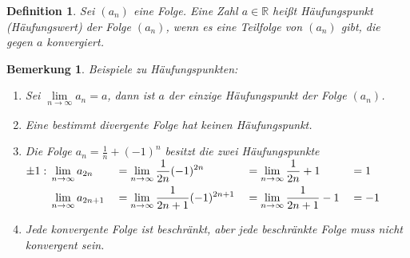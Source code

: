 \documentclass[a4paper,titlepage,oneside]{article}
\def\R{\ensuremath{\mathbb{R}} }
\renewcommand{\liminf}[2][n]{\ensuremath{\lim\limits_{#1 \rightarrow \infty}{#2}}}
\theoremstyle{thmstyle}
\newtheorem{defi}[satz]{Definition}
\newtheorem{bem}[satz]{Bemerkung}
\theoremstyle{subthmstyle}
\begin{document}
\begin{defi}
Sei \((a_n)\) eine Folge. Eine Zahl \(a \in \R\) heißt Häufungspunkt (Häufungswert) der Folge \((a_n)\), wenn es eine Teilfolge von \((a_n)\) gibt, die gegen \(a\) konvergiert.
\end{defi}

\begin{bem}
Beispiele zu Häufungspunkten:
\begin{enumerate}
\item Sei \(\liminf{a_n} = a\), dann ist \(a\) der einzige Häufungspunkt der Folge \((a_n)\).
\item Eine bestimmt divergente Folge hat keinen Häufungspunkt.
\item Die Folge $ \displaystyle a_n = \frac{1}{n}+ (-1)^n $ besitzt die zwei Häufungspunkte $ \displaystyle \pm 1:\\
\begin{aligned}[t] &\liminf{a_{2n}} &&= \liminf{\frac{1}{2n} (-1)^{2n}} &&= \liminf{\frac{1}{2n}} + 1 &&= 1 \\
&\liminf{a_{2n+1}} &&= \liminf{\frac{1}{2n+1} (-1)^{2n+1}} &&= \liminf{\frac{1}{2n+1}} - 1 &&= - 1
\end{aligned}$
\item Jede konvergente Folge ist beschränkt, aber jede beschränkte Folge muss nicht konvergent sein.
\end{enumerate}
\end{bem}
\end{document}

